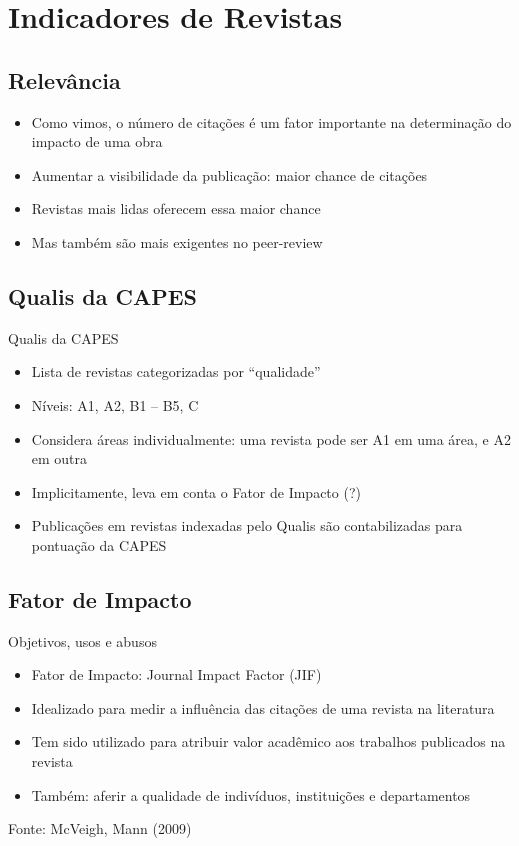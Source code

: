 \documentclass{beamer}
\begin{document}
\section{Indicadores de Revistas}

\subsection{Relevância}

\begin{frame}
  \begin{itemize}
  \item Como vimos, o número de citações é um fator importante na determinação do impacto de uma obra
  \item Aumentar a visibilidade da publicação: maior chance de citações
  \item Revistas mais lidas oferecem essa maior chance
  \item Mas também são mais exigentes no peer-review
  \end{itemize}
\end{frame}

\subsection{Qualis da CAPES}

\begin{frame}{Qualis da CAPES}
  \begin{itemize}
  \item Lista de revistas categorizadas por ``qualidade''
  \item Níveis: A1, A2, B1 -- B5, C
  \item Considera áreas individualmente: uma revista pode ser A1 em uma área, e A2 em outra
  \item Implicitamente, leva em conta o Fator de Impacto (?)
  \item Publicações em revistas indexadas pelo Qualis são contabilizadas para pontuação da CAPES
  \end{itemize}
\end{frame}

\subsection{Fator de Impacto}

\begin{frame}{Objetivos, usos e abusos}
  \begin{itemize}
  \item Fator de Impacto: Journal Impact Factor (JIF)
  \item Idealizado para medir a influência das citações de uma revista na literatura
  \item Tem sido utilizado para atribuir valor acadêmico aos trabalhos publicados na revista
  \item Também: aferir a qualidade de indivíduos, instituições e departamentos
  \end{itemize}

  \vfill
  Fonte: McVeigh, Mann (2009)
\end{frame}
\end{document}
